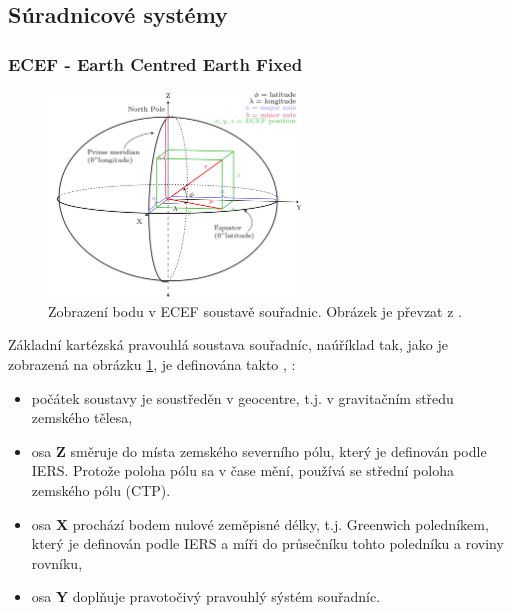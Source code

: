 \documentclass[11pt,a4paper]{article}
\begin{document}
\newpage
\subsection{Súradnicové systémy}


\subsubsection{ECEF - Earth Centred Earth Fixed}

\begin{figure}[ht!]
\begin{center}

\includegraphics[width=0.60\textwidth]{FIG/ecef_wiki}
\caption{Zobrazení bodu v ECEF soustavě souřadnic. Obrázek je převzat z \cite{ecefWiki}.}
\label{fig:ecef}
\end{center}
\end{figure}

Základní kartézská pravouhlá soustava souřadníc, naúříklad tak, jako je zobrazená na obrázku \ref{fig:ecef}, je definována takto \cite{Soler1988}, \cite{Kovar2016}:

\begin{itemize}
\item počátek soustavy je soustředěn v geocentre, t.j. v gravitačním středu zemského tělesa,
\item osa \textbf{Z} směruje do místa zemského severního pólu, který je definován podle IERS. Protože poloha pólu sa v čase mění, používá se střední poloha zemského pólu (CTP).
\item osa \textbf{X} prochází bodem nulové zeměpisné délky, t.j. Greenwich poledníkem, který je definován podle IERS a míři do průsečníku tohto poledníku a roviny rovníku,
\item osa \textbf{Y} doplňuje pravotočivý pravouhlý sýstém souřadníc.
\end{itemize}
\end{document}
